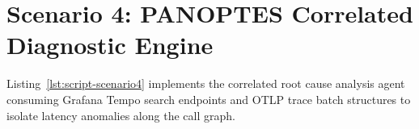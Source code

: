 \section{Scenario 4: PANOPTES Correlated Diagnostic Engine}
\label{sec:app-script-scenario4}

Listing~\ref{lst:script-scenario4} implements the correlated root cause analysis agent consuming Grafana Tempo search endpoints and OTLP trace batch structures to isolate latency anomalies along the call graph.

